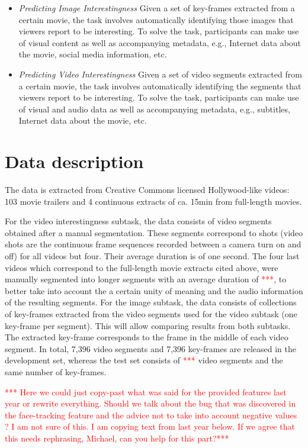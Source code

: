 \documentclass[sigconf]{acmart-me}
\begin{document}
\begin{itemize}
\item \emph{Predicting Image Interestingness} Given a set of key-frames extracted from a certain movie, the task involves automatically identifying those images that viewers report to be interesting. To solve the task, participants can make use of visual content as well as accompanying metadata, e.g., Internet data about the movie, social media information, etc.
\item \emph{Predicting Video Interestingness} Given a set of video segments extracted from a certain movie, the task involves automatically identifying the segments that viewers report to be interesting. To solve the task, participants can make use of visual and audio data as well as accompanying metadata, e.g., subtitles, Internet data about the movie, etc.
\end{itemize}


\section{Data description}

The data is extracted from Creative Commons licensed Hollywood-like videos: 103 movie trailers and 4 continuous extracts of ca. 15min from full-length movies. 

For the video interestingness subtask, the data consists of video segments obtained after a manual segmentation. These segments correspond to shots (video shots are the continuous frame sequences recorded between a camera turn on and off) for all videos but four. Their average duration is of one second. The four last videos which correspond to the full-length movie extracts cited above, were manually segmented into longer segments with an average duration of \textcolor{red}{***}, to better take into account the a certain unity of meaning and the audio information of the resulting segments. For the image subtask, the data consists of collections of key-frames extracted from the video segments used for the video subtask (one key-frame per segment). This will allow comparing results from both subtasks. The extracted key-frame corresponds to the frame in the middle of each video segment.
In total, 7,396 video segments and 7,396 key-frames are released in the development set, whereas the test set consists of \textcolor{red}{***} video segments and the same number of key-frames.

\textcolor{red}{*** Here we could just copy-past what was said for the provided features last year or rewrite everything. Should we talk about the bug that was discovered in the face-tracking feature and the advice not to take into account negative values ? I am not sure of this. I am copying text from last year below. If we agree that this needs rephrasing, Michael, can you help for this part?***}
\end{document}

